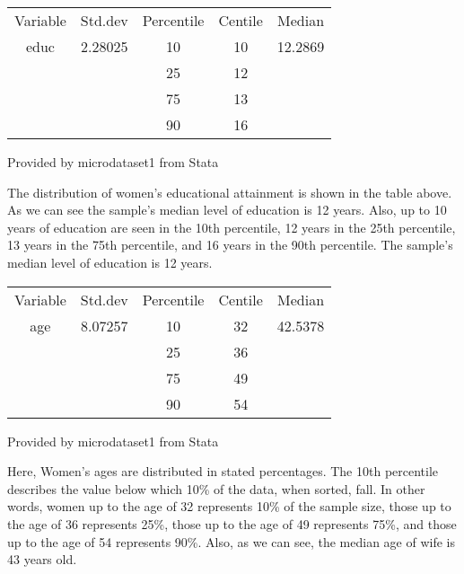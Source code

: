 \documentclass[10pt,towside,a4paper]{article}
\begin{document}
\begin{table}[h]
	\begin{Center}
		 \label{tab:title} 
	\begin{tabular}{|c|c|c|c|c|}
		\toprule
		Variable & Std.dev & Percentile & Centile 	&	Median 	 \\
		educ     & 2.28025 & 10 		& 10  		&	12.2869  \\
				 &		   & 25  	    & 12    	&  			\\                            
				 &         & 75  		& 13    	&   		\\
				 &         & 90  		& 16    	& 			\\
		\bottomrule
	\end{tabular} \par
	Provided by microdataset1 from Stata
	\end{Center}
	The distribution of women’s educational attainment is shown in the table above. As we can see the sample’s median level of education is 12 years. Also, up to 10 years of education are seen in the 10th percentile, 12 years in the 25th percentile, 13 years in the 75th percentile, and 16 years in the 90th percentile. The sample’s median level of education is 12 years. 
\end{table}
	

\begin{table}[h!]
		\begin{Center}
			 \label{tab:title} 
			\begin{tabular}{|c|c|c|c|c|}
				\toprule
				Variable & Std.dev & Percentile & Centile 	&	Median 	 \\
				age      & 8.07257 & 10 		& 32  		&	42.5378  \\
				&		 		   & 25  	    & 36    	&  			\\                            
				&         		   & 75  		& 49    	&   		\\
				&         		   & 90  		& 54    	& 			\\
				\bottomrule
			\end{tabular} \par
			Provided by microdataset1 from Stata
		\end{Center}
		Here, Women’s ages are distributed in stated percentages. The 10th percentile describes the value below which 10\% of the data, when sorted, fall. In other words, women up to the age of 32 represents 10\% of the sample size, those up to the age of 36 represents 25\%, those up to the age of 49 represents 75\%, and those up to the age of 54 represents 90\%. Also, as we can see, the median age of wife is 43 years old. 
\end{table}
\end{document}

